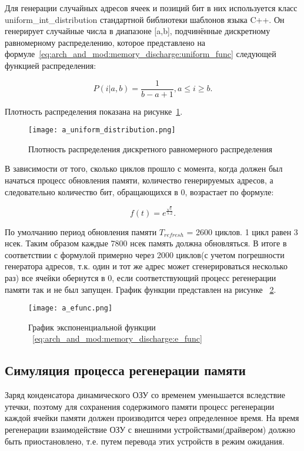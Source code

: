 Для генерации случайных адресов ячеек и позиций бит в них используется класс uniform\_int\_distribution стандартной библиотеки шаблонов языка C++. 
Он генерирует случайные числа в диапазоне [a,b], подчинённые дискретному равномерному распределению, которое представлено на формуле~\ref{eq:arch_and_mod:memory_discharge:uniform_func} следующей функцией распределения:

\begin{equation}
  \label{eq:arch_and_mod:memory_discharge:uniform_func}
  P(i|a,b) = \frac{1}
           {b-a+1}, a \le i \ge b.
\end{equation}

Плотность распределения показана на рисунке~\ref{fig:arch_and_mod:modules:uniform_distribution}.

\begin{figure}[ht]
\centering
  \texttt{[image: a\_uniform\_distribution.png]}  
  \caption{Плотность распределения дискретного равномерного распределения}
  \label{fig:arch_and_mod:modules:uniform_distribution}
\end{figure}

В зависимости от того, сколько циклов прошло с момента, когда должен был начаться процесс обновления памяти, количество генерируемых адресов, а следовательно количество бит, обращающихся в 0, возрастает по формуле:

\begin{equation}
  \label{eq:arch_and_mod:memory_discharge:e_func}
  f(t) = e^{\frac{\sqrt{t}}
           {5.2}}.
\end{equation}

По умолчанию период обновления памяти $T_{refresh}$ = 2600 циклов. 1 цикл равен 3 нсек. Таким образом каждые 7800 нсек память должна обновляться. В итоге в соответствии с формулой примерно через 2000 циклов(с учетом погрешности генератора адресов, т.к. один и тот же адрес может сгенерироваться несколько раз) все ячейки обернутся в 0, если соответствующий процесс регенерации памяти так и не был запущен. График функции представлен на рисунке ~\ref{fig:arch_and_mod:memory_discharge:efunc_grafic}.

\begin{figure}[ht]
\centering
  \texttt{[image: a\_efunc.png]}  
  \caption{График экспоненциальной функции ~\ref{eq:arch_and_mod:memory_discharge:e_func}}
  \label{fig:arch_and_mod:memory_discharge:efunc_grafic}
\end{figure}

\subsection{Симуляция процесса регенерации памяти}
\label{sub:arch_and_mod:memory_refresh}
Заряд конденсатора динамического ОЗУ со временем уменьшается вследствие утечки, поэтому для сохранения содержимого памяти процесс регенерации каждой ячейки памяти должен производится через определенное время. На время регенерации взаимодействие ОЗУ с внешними устройствами(драйвером) должно быть приостановлено, т.е. путем перевода этих устройств в режим ожидания.

